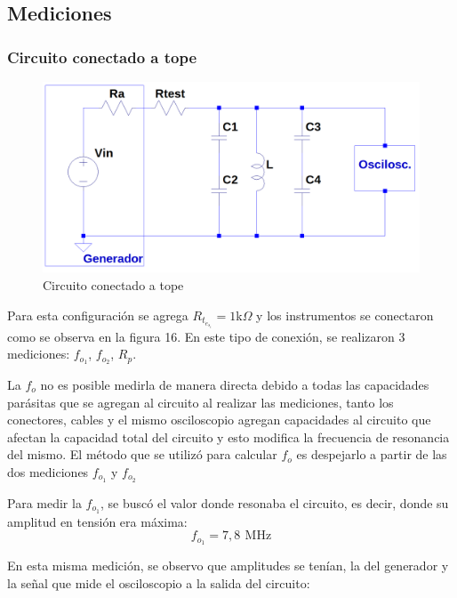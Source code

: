 \newpage
\subsection{Mediciones}
\subsubsection{Circuito conectado a tope}
\begin{figure}[!h]
    \centering
    \includegraphics[scale=0.3]{Imagenes/Circuito conectado a tope.png}
    \caption{Circuito conectado a tope}
    \label{fig:Circtope}
\end{figure}
Para esta configuración se agrega \(R_t_e_s_t = 1\)k\(\Omega\) y los instrumentos se conectaron como se observa en la figura 16.
En este tipo de conexión, se realizaron 3 mediciones: \(f_o_1\), \(f_o_2\), \(R_p\).

La \(f_o\) no es posible medirla de manera directa debido a todas las capacidades parásitas que se agregan al circuito al realizar las mediciones, tanto los conectores, cables y el mismo osciloscopio agregan capacidades al circuito que afectan la capacidad total del circuito y esto modifica la frecuencia de resonancia del mismo. El método que se utilizó para calcular \(f_o\) es despejarlo a partir de  las dos mediciones \(f_o_1\) y \(f_o_2\)\ %

Para medir la \(f_o_1\), se buscó el valor donde resonaba el circuito, es decir, donde su amplitud en tensión era máxima:
\begin{equation}
    f_o_1 = 7,8 \,\ \text{MHz} 
\end{equation}

En esta misma medición, se observo que amplitudes se tenían, la del generador y la señal que mide el osciloscopio a la salida del circuito:

